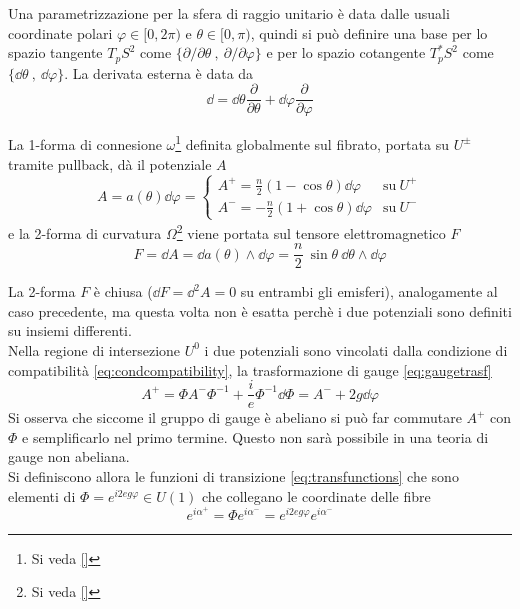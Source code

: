 Una parametrizzazione per la sfera di raggio unitario è data dalle usuali
coordinate polari $\varphi  \in[0,2\pi)$ e $\theta \in [0,\pi)$,
quindi si può definire una base per lo spazio tangente $T_pS^2$ come
$\{ \partial / \partial \theta \: , \: \partial / \partial \varphi  \}$
e per lo spazio cotangente $T^*_pS^2$ come $\{ \dd \theta \: , \: \dd \varphi  \}$.
La derivata esterna è data da
$$
   \dd  = \dd \theta \frac{\partial}{\partial \theta}
        + \dd \varphi    \frac{\partial}{\partial \varphi  }
$$

La 1-forma di connesione $\omega$\footnote{Si veda \ref{}}
definita globalmente sul fibrato, portata su $U^\pm$ tramite pullback,
dà il potenziale $A$
$$
   A = a(\theta)\dd \varphi =  \begin{cases}
      A^+ =  \frac{n}{2}(1 - \cos\theta ) \dd \varphi  & \mathrm{su \:} U^+ \\
      A^- = -\frac{n}{2}(1 + \cos\theta ) \dd \varphi  & \mathrm{su \:} U^-
   \end{cases}
$$
e la 2-forma di curvatura $\Omega$\footnote{Si veda \ref{}} viene portata
sul tensore elettromagnetico $F$
$$
   F = \dd A = \dd a(\theta)\wedge \dd \varphi= \frac{n}{2} \: \sin\theta \: \dd \theta \wedge \dd \varphi
$$

La 2-forma $F$ è chiusa ($\dd F = \dd ^2A = 0$ su entrambi gli emisferi),
analogamente al caso precedente, ma questa volta non è esatta perchè i due potenziali
sono definiti su insiemi differenti.\\

Nella regione di intersezione $U^0$ i due potenziali sono vincolati dalla condizione
di compatibilità \ref{eq:condcompatibility}, la trasformazione di gauge \ref{eq:gaugetrasf}
$$
   A^+ = \Phi A^- \Phi ^{-1} + \frac{i}{e}\Phi ^{-1} \dd \Phi
       = A^- + 2g \dd  \varphi
$$
Si osserva che siccome il gruppo di gauge è abeliano si può far commutare $A^+$
con $\Phi$ e semplificarlo nel primo termine. Questo non sarà possibile in una
teoria di gauge non abeliana. \\
Si definiscono allora le funzioni di transizione \ref{eq:transfunctions}
che sono elementi di $\Phi = e^{i 2eg \varphi} \in U(1)$ che collegano le coordinate delle fibre
$$
    e^{i\alpha^+} = \Phi  e^{i\alpha^-} = e^{i2eg\varphi } e^{i\alpha^-}
$$

